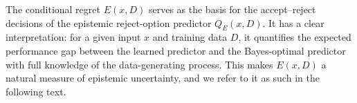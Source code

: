 The conditional regret $E(x, D)$ serves as the basis for the accept–reject decisions of the epistemic reject-option predictor $Q_E(x, D)$. It has a clear interpretation: for a given input $x$ and training data $D$, it quantifies the expected performance gap between the learned predictor and the Bayes-optimal predictor with full knowledge of the data-generating process. This makes $E(x, D)$ a natural measure of epistemic uncertainty, and we refer to it as such in the following text.

%



